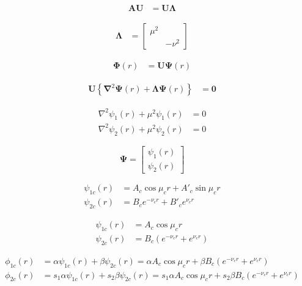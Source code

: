 \begin{align}
    \pmb{A}\pmb{U} &= \pmb{U}\pmb{\Lambda}
\end{align}

\begin{align}
    \pmb{\Lambda} &= \begin{bmatrix}
        \mu^2 & \\
         & -\nu^2
    \end{bmatrix}
\end{align}

\begin{align}
    \pmb{\Phi}(r) &= \pmb{U}\pmb{\Psi}(r)
\end{align}

\begin{align}
    \pmb{U}\left\{\pmb{\nabla}^2\pmb{\Psi}(r)+\pmb{\Lambda}\pmb{\Psi}(r)\right\} &= \pmb{0}
\end{align}

\begin{align}
    \nabla^2\psi_1(r) + \mu^2\psi_1(r) &= 0 \\
    \nabla^2\psi_2(r) + \mu^2\psi_2(r) &= 0
\end{align}

\begin{equation}
    \pmb{\Psi} = \begin{bmatrix}
        \psi_1(r) \\
        \psi_2(r)
    \end{bmatrix}
\end{equation}

\begin{align}
    \psi_{1c}(r) &= A_c\cos{\mu_c r} + A'_c\sin{\mu_c r} \\
    \psi_{2c}(r) &= B_c e^{-\nu_c r} + B'_c e^{\nu_c r}
\end{align}

\begin{align}
    \psi_{1c}(r) &= A_c\cos{\mu_c r} \\
    \psi_{2c}(r) &= B_c\left(e^{-\nu_c r} + e^{\nu_c r}\right)
\end{align}

\begin{align}
    \phi_{1c}(r) &= \alpha\psi_{1c}(r) + \beta\psi_{2c}(r) = \alpha A_c\cos{\mu_c r} + \beta B_c\left(e^{-\nu_c r} + e^{\nu_c r}\right) \\
    \phi_{2c}(r) &= s_1\alpha\psi_{1c}(r) + s_2\beta\psi_{2c}(r) = s_1\alpha A_c\cos{\mu_c r} + s_2\beta B_c\left(e^{-\nu_c r} + e^{\nu_c r}\right)
\end{align}


